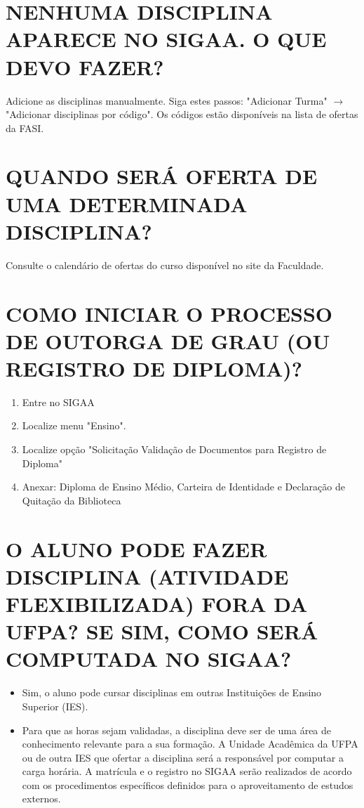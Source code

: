 \documentclass[12pt, a4paper]{article}
\begin{document}
\section{NENHUMA DISCIPLINA APARECE NO SIGAA. O QUE DEVO FAZER?}
Adicione as disciplinas manualmente. Siga estes passos: "Adicionar Turma" $\rightarrow$ "Adicionar disciplinas por código". Os códigos estão disponíveis na lista de ofertas da FASI.

\section{QUANDO SERÁ OFERTA DE UMA DETERMINADA DISCIPLINA?}
Consulte o calendário de ofertas do curso disponível no site da Faculdade.

\section{COMO INICIAR O PROCESSO DE OUTORGA DE GRAU (OU REGISTRO DE DIPLOMA)?}
\begin{enumerate}
    \item Entre no SIGAA
    \item Localize menu "Ensino".
    \item Localize opção "Solicitação Validação de Documentos para Registro de Diploma"
    \item Anexar: Diploma de Ensino Médio, Carteira de Identidade e Declaração de Quitação da Biblioteca
\end{enumerate}

\section{O ALUNO PODE FAZER DISCIPLINA (ATIVIDADE FLEXIBILIZADA) FORA DA UFPA? SE SIM, COMO SERÁ COMPUTADA NO SIGAA?}
\begin{itemize}
    \item Sim, o aluno pode cursar disciplinas em outras Instituições de Ensino Superior (IES).
    \item Para que as horas sejam validadas, a disciplina deve ser de uma área de conhecimento relevante para a sua formação. A Unidade Acadêmica da UFPA ou de outra IES que ofertar a disciplina será a responsável por computar a carga horária. A matrícula e o registro no SIGAA serão realizados de acordo com os procedimentos específicos definidos para o aproveitamento de estudos externos.
\end{itemize}
\end{document}
